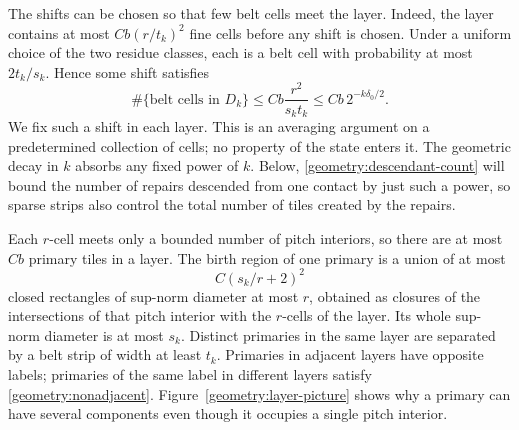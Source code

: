 The shifts can be chosen so that few belt cells meet the layer.  Indeed,
the layer contains at most $Cb(r/t_k)^2$ fine cells before any shift is
chosen.  Under a uniform choice of the two residue classes, each is a
belt cell with probability at most $2t_k/s_k$.  Hence some shift satisfies
\begin{equation}
\label{geometry:belt-count}
 \#\{\text{belt cells in }D_k\}
 \le Cb\frac{r^2}{s_kt_k}
 \le Cb\,2^{-k\delta_0/2}.
\end{equation}
We fix such a shift in each layer.  This is an averaging argument on a
predetermined collection of cells; no property of the state enters it.
The geometric decay in $k$ absorbs any fixed power of $k$.  Below,
\eqref{geometry:descendant-count} will bound the number of repairs
descended from one contact by just such a power, so sparse strips also
control the total number of tiles created by the repairs.

Each $r$-cell meets only a bounded number of pitch interiors, so there
are at most $Cb$ primary tiles in a layer.  The birth region of one
primary is a union of at most
\begin{equation}
\label{geometry:primary-pieces}
 C(s_k/r+2)^2
\end{equation}
closed rectangles of sup-norm diameter at most $r$, obtained as closures
of the intersections of that pitch interior with the $r$-cells of the
layer.  Its whole sup-norm diameter is at most $s_k$.  Distinct primaries in the same layer are separated by a belt
strip of width at least $t_k$.  Primaries in adjacent layers have opposite
labels; primaries of the same label in different layers satisfy
\eqref{geometry:nonadjacent}.
Figure~\ref{geometry:layer-picture} shows why a primary can have several
components even though it occupies a single pitch interior.

